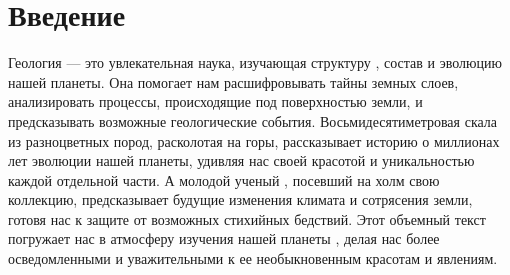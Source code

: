 \chapter*{Введение}
Геология --- это увлекательная наука, изучающая структуру \citep{korolyuk1960}, состав и эволюцию нашей планеты. Она помогает нам расшифровывать тайны земных слоев, анализировать процессы, происходящие под поверхностью земли, и предсказывать возможные геологические события. Восьмидесятиметровая скала \citep{Shukolyukov1974} из разноцветных пород, расколотая на горы, рассказывает историю о миллионах лет эволюции нашей планеты, удивляя нас своей красотой и уникальностью каждой отдельной части. А молодой ученый \citep{Roberts2020}, посевший на холм свою коллекцию, предсказывает будущие изменения климата и сотрясения земли, готовя нас к защите от возможных стихийных бедствий. Этот объемный текст погружает нас в атмосферу изучения нашей планеты , делая нас более осведомленными и уважительными к ее необыкновенным красотам и явлениям.
